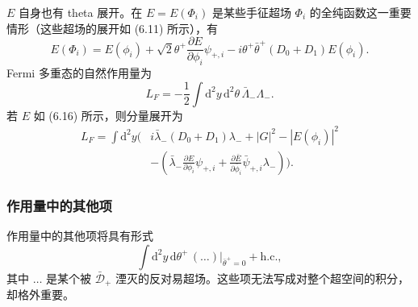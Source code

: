 
$E$ 自身也有 theta 展开。在 $E=E(\Phi_i)$ 是某些手征超场 $\Phi_i$ 的全纯函数这一重要情形（这些超场的展开如 (6.11) 所示），有
\begin{equation} E(\Phi_i)=E(\phi_i)+\sqrt2\theta^+\frac{\partial E}{\partial\phi_i}\psi_{+,i}-i\theta^+\bar\theta^+(D_0+D_1)E(\phi_i).\tag{6.16}
\end{equation}
Fermi 多重态的自然作用量为
\begin{equation} L_F=-\frac{1}{2}\int\mathrm{d}^2y\,\mathrm{d}^2\theta\,\bar\Lambda_-\Lambda_-.\tag{6.17}
\end{equation}
若 $E$ 如 (6.16) 所示，则分量展开为
\begin{equation}
\begin{aligned} L_F=\int\mathrm{d}^2y\bigg(&i\bar\lambda_-(D_0+D_1)\lambda_-+|G|^2-|E(\phi_i)|^2\\ &-\left(\bar\lambda_-\frac{\partial E}{\partial\phi_i}\psi_{+,i}+\frac{\partial\bar E}{\partial\bar\phi_i}\bar\psi_{+,i}\lambda_-\right)\bigg). \end{aligned}\tag{6.18}
\end{equation}


\label{op:79}
\subsubsection*{作用量中的其他项}

作用量中的其他项将具有形式
\begin{equation}
\int\mathrm{d}^2y\,\mathrm{d}\theta^+\,(\ldots)\big|_{\bar\theta^+=0}+\mathrm{h.c.},\tag{6.19}
\end{equation}
其中 $\ldots$ 是某个被 $\bar{\mathcal{D}}_+$ 湮灭的反对易超场。这些项无法写成对整个超空间的积分，却格外重要。

